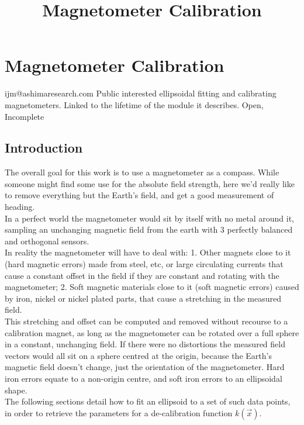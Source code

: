 \documentclass{article}
\begin{document}
\title{Magnetometer Calibration}
\section{Magnetometer Calibration}
{ijm@ashimaresearch.com}
{Public interested ellipsoidal fitting and calibrating magnetometers.}
{Linked to the lifetime of the module it describes.}
{Open, Incomplete}
\subsection{Introduction}
The overall goal for this work is to use a magnetometer as a
compass. While someone might find some use for the absolute field
strength, here we'd really like to remove everything but the Earth's
field, and get a good measurement of heading.
\\
In a perfect world the magnetometer would sit by itself with no
metal around it, sampling an unchanging magnetic field from the
earth with 3 perfectly balanced and orthogonal sensors.
\\
In reality the magnetometer will have to deal with: 1. Other magnets
close to it (hard magnetic errors) made from steel, etc, or large
circulating currents that cause a constant offset in the field if
they are constant and rotating with the magnetometer; 2. Soft magnetic materials
close to it (soft magnetic errors) caused by iron, nickel or nickel
plated parts, that cause a stretching in the measured field.
\\
This stretching and offset can be computed and removed without
recourse to a calibration magnet, as long as the magnetometer can
be rotated over a full sphere in a constant, unchanging field. If
there were no distortions the measured field vectors would all sit on a sphere
centred at the origin, because the Earth's magnetic field doesn't change, just the
orientation of the magnetometer. Hard iron errors equate to a non-origin
centre, and soft iron errors to an ellipsoidal shape.
\\
The following sections detail how to fit an ellipsoid to a set of
such data points, in order to retrieve the parameters for a
de-calibration function $k(\vec{x})$.\\
\\
\end{document}
